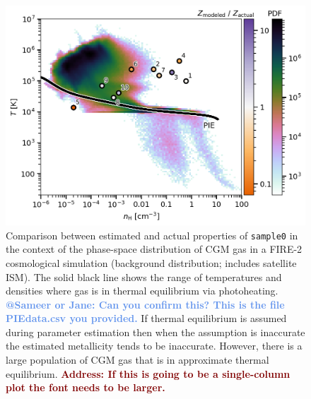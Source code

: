 \documentclass[fleqn,usenatbib]{mnras}
\makeatletter
\newcommand{\todo}[1]{\textcolor{Maroon}{\textbf{Address: #1}}}
\newcommand{\atsameer}[1]{\textcolor{CornflowerBlue}{\textbf{@Sameer or Jane: #1}}}
\makeatother
\begin{document}
\begin{figure}
    \centering
    \includegraphics[width=\columnwidth]{figures/sample0/phase_space.png}
    \caption{
    Comparison between estimated and actual properties of \texttt{sample0} in the context of the phase-space distribution of CGM gas in a FIRE-2 cosmological simulation (background distribution; includes satellite ISM).
    The solid black line shows the range of temperatures and densities where gas is in thermal equilibrium via photoheating.
    \atsameer{Can you confirm this? This is the file PIEdata.csv you provided.}
    If thermal equilibrium is assumed during parameter estimation then when the assumption is inaccurate the estimated metallicity tends to be inaccurate.
    However, there is a large population of CGM gas that is in approximate thermal equilibrium.
    \todo{If this is going to be a single-column plot the font needs to be larger.}
    }
    \label{f: idealized explanation}
\end{figure}
\end{document}
